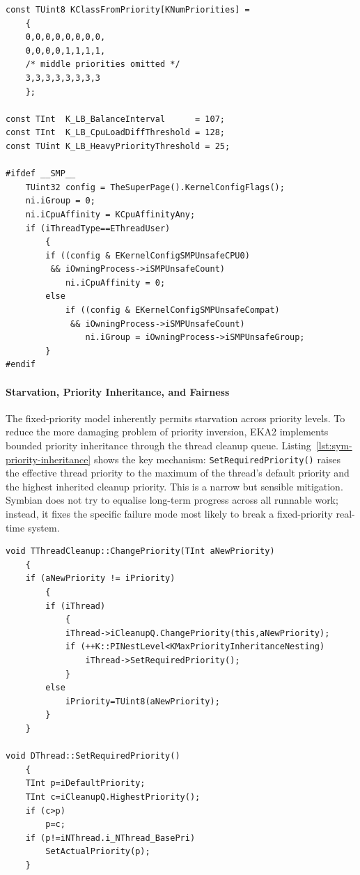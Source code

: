 \begin{listing}[H]
\begin{verbatim}
const TUint8 KClassFromPriority[KNumPriorities] =
	{
	0,0,0,0,0,0,0,0,
	0,0,0,0,1,1,1,1,
	/* middle priorities omitted */
	3,3,3,3,3,3,3,3
	};

const TInt  K_LB_BalanceInterval      = 107;
const TInt  K_LB_CpuLoadDiffThreshold = 128;
const TUint K_LB_HeavyPriorityThreshold = 25;

#ifdef __SMP__
	TUint32 config = TheSuperPage().KernelConfigFlags();
	ni.iGroup = 0;
	ni.iCpuAffinity = KCpuAffinityAny;
	if (iThreadType==EThreadUser)
		{
		if ((config & EKernelConfigSMPUnsafeCPU0)
		 && iOwningProcess->iSMPUnsafeCount)
			ni.iCpuAffinity = 0;
		else
			if ((config & EKernelConfigSMPUnsafeCompat)
			 && iOwningProcess->iSMPUnsafeCount)
				ni.iGroup = iOwningProcess->iSMPUnsafeGroup;
		}
#endif
\end{verbatim}
\caption{SMP priority classes, balance thresholds, and affinity handling.
Files: \texttt{nkernsmp/sched.cpp}, \texttt{nk\_bal.cpp}, and
\texttt{sthread.cpp}.}
\label{lst:sym-smp}
\end{listing}

\paragraph{Starvation, Priority Inheritance, and Fairness}

The fixed-priority model inherently permits starvation across priority levels.
To reduce the more damaging problem of priority inversion, EKA2 implements
bounded priority inheritance through the thread cleanup queue.
Listing~\ref{lst:sym-priority-inheritance} shows the key mechanism:
\texttt{SetRequiredPriority()} raises the effective thread priority to the
maximum of the thread's default priority and the highest inherited cleanup
priority. This is a narrow but sensible mitigation. Symbian does not try to
equalise long-term progress across all runnable work; instead, it fixes the
specific failure mode most likely to break a fixed-priority real-time system.

\begin{listing}[H]
\begin{verbatim}
void TThreadCleanup::ChangePriority(TInt aNewPriority)
	{
	if (aNewPriority != iPriority)
		{
		if (iThread)
			{
			iThread->iCleanupQ.ChangePriority(this,aNewPriority);
			if (++K::PINestLevel<KMaxPriorityInheritanceNesting)
				iThread->SetRequiredPriority();
			}
		else
			iPriority=TUint8(aNewPriority);
		}
	}

void DThread::SetRequiredPriority()
	{
	TInt p=iDefaultPriority;
	TInt c=iCleanupQ.HighestPriority();
	if (c>p)
		p=c;
	if (p!=iNThread.i_NThread_BasePri)
		SetActualPriority(p);
	}
\end{verbatim}
\caption{Priority inheritance through cleanup-linked propagation. File:
\texttt{sthread.cpp}.}
\label{lst:sym-priority-inheritance}
\end{listing}
